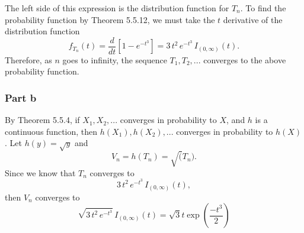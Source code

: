 \documentclass{article}
\begin{document}
The left side of this expression is the distribution function for $T_n$. To find the probability function by Theorem 5.5.12, we must take the $t$ derivative of the distribution function
\[f_{T_n}(t) = \frac{d}{dt}\left[1 - e^{-t^3}\right] = 3\,t^2\,e^{-t^3}\,I_{(0,\infty)}(t).\]
Therefore, as $n$ goes to infinity, the sequence $T_1, T_2, ...$ converges to the above probability function. 

\subsubsection*{Part b}
By Theorem 5.5.4, if $X_1, X_2, ...$ converges in probability to $X$, and $h$ is a continuous function, then $h(X_1), h(X_2), ...$ converges in probability to $h(X)$. Let $h(y) = \sqrt{y}$ and 
\[V_n = h(T_n) = \sqrt(T_n).\] Since we know that $T_n$ converges to 
\[3\,t^2\,e^{-t^3}\,I_{(0,\infty)}(t),\] then $V_n$ converges to 
\[\sqrt{ 3\,t^2\,e^{-t^3}}\,I_{(0,\infty)}(t) = \sqrt{3}t\exp{\left(\frac{-t^3}{2}\right)}\]




\iffalse
Since the $X_i$ are independent of each other, the probability that all $X_i$ in the series $X_1, X_2, ... , X_n$ are less than $x$ is \[P\left(\text{max}\{X_1, ... , X_n\} < x\right) = \left((x-1)^3 + 1\right)^n.\]
This is the definition of a distribution function 
\[F_{\text{max}}(x) = \begin{cases}
0, &x < 0 \\
\left((x-1)^3 + 1\right)^n, &0\leq x \leq1 \\
1, & x > 1.\end{cases}\] The limit of this distribution in $n$ is 
\[F_{\text{max}}(x) = \begin{cases}
0, &x < 1 \\1, & x \geq 1.\end{cases}\]
\fi

\iffalse
, we can determine the probability that any one $_i$ is more than $\epsilon$ away from the maximum possible value, $1$. We can say that for all $X_i$ with $0<i<n$,
\[ P(X_i \leq 1 - \epsilon) = \left((1-\epsilon)-1\right)^3+1 = 1 - \epsilon^3\] for $x = 1 - \epsilon; \,\,0 \leq \epsilon \leq 1$. Since the $X_i$ are independent of each other, the probability that all $X_i$ in the series $X_1, X_2, ... , X_n$ are less than $1-\epsilon$ is \[P\left(\text{max}\{X_1, ... , X_n\} < 1 - \epsilon\right) = \left(1-\epsilon^3\right)^n.\]
This is the definition of a distribution function \[F_{\text{max}}(1-\epsilon) = \left(1-\epsilon^3\right)^n\,I_\epsilon(0,1).\] The distribution function for $T_n$ can thus be obtained as 
\[T_n(1-\epsilon) = n^{1/3}\left(1-\left(1-\epsilon^3\right)^n\right)\,I_\epsilon(0,1).\]
\fi
\end{document}
